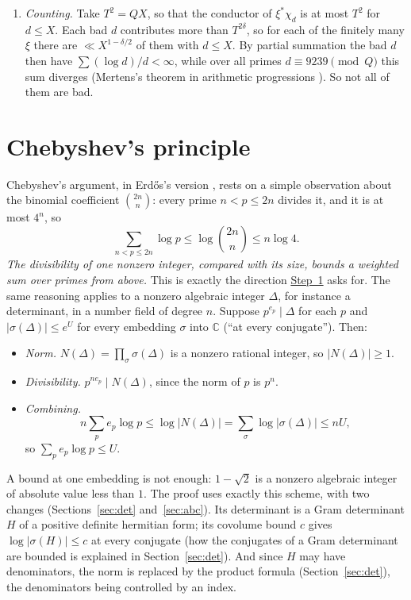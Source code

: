 \documentclass[11pt]{amsart}
\numberwithin{equation}{section}
\theoremstyle{definition}
\theoremstyle{remark}
\newcommand{\C}{\mathbb C}
\begin{document}
\begin{enumerate}[leftmargin=2em]
\begin{equation}
 \sum_{v\le T^2}J(\alpha_v,T)\ll T^{2+\delta}.
\end{equation}

\item \emph{Counting.} Take $T^2=QX$, so that the conductor of $\xi^*\chi_d$ is at most $T^2$ for $d\le X$. Each bad $d$ contributes more than $T^{2\delta}$, so for each of the finitely many $\xi$ there are $\ll X^{1-\delta/2}$ of them with $d\le X$. By partial summation the bad $d$ then have $\sum(\log d)/d<\infty$, while over all primes $d\equiv9239\pmod Q$ this sum diverges (Mertens's theorem in arithmetic progressions \cite{Davenport}). So not all of them are bad.
\end{enumerate}

\section{Chebyshev's principle}\label{sec:cheb}

Chebyshev's argument, in Erd\H os's version \cite{erdos}, rests on a simple observation about the binomial coefficient $\binom{2n}{n}$: every prime $n<p\le2n$ divides it, and it is at most $4^n$, so
\begin{equation}
 \sum_{n<p\le2n}\log p\le \log \binom{2n}{n} \le n\log4 .
\end{equation}
\emph{The divisibility of one nonzero integer, compared with its size, bounds a weighted sum over primes from above.} This is exactly the direction \hyperref[step:1]{Step~1} asks for. The same reasoning applies to a nonzero algebraic integer $\Delta$, for instance a determinant, in a number field of degree $n$. Suppose $p^{e_p}\mid\Delta$ for each $p$ and $|\sigma(\Delta)|\le e^U$ for every embedding $\sigma$ into $\C$ (``at every conjugate''). Then:
\begin{itemize}[leftmargin=2em]
\item \emph{Norm.} $N(\Delta)=\prod_\sigma\sigma(\Delta)$ is a nonzero rational integer, so $|N(\Delta)|\ge1$.
\item \emph{Divisibility.} $p^{ne_p}\mid N(\Delta)$, since the norm of $p$ is $p^n$.
\item \emph{Combining.}
\begin{equation}
 n\sum_pe_p\log p\le\log|N(\Delta)|=\sum_\sigma\log|\sigma(\Delta)|\le nU,
\end{equation}
so $\sum_pe_p\log p\le U$.
\end{itemize}
A bound at one embedding is not enough: $1-\sqrt2$ is a nonzero algebraic integer of absolute value less than $1$. The proof uses exactly this scheme, with two changes (Sections~\ref{sec:det} and~\ref{sec:abc}). Its determinant is a Gram determinant $H$ of a positive definite hermitian form; its covolume bound $c$ gives $\log|\sigma(H)|\le c$ at every conjugate (how the conjugates of a Gram determinant are bounded is explained in Section~\ref{sec:det}). And since $H$ may have denominators, the norm is replaced by the product formula (Section~\ref{sec:det}), the denominators being controlled by an index.
\end{document}

